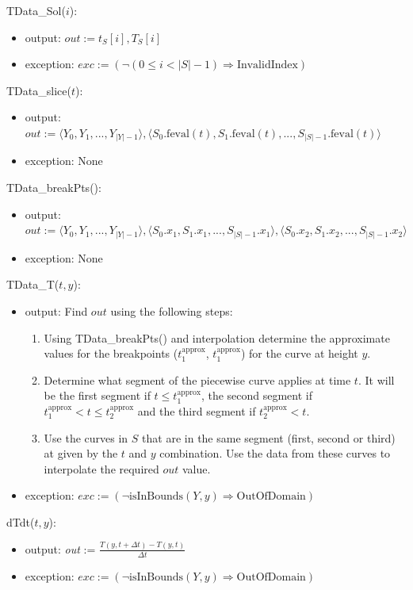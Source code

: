 \documentclass[12pt, titlepage]{article}
\begin{document}
\noindent TData\_Sol($i$):
\begin{itemize}
\item output: $out := t_S[i], T_S[i]$
\item exception: $exc := (\neg(0 \leq i < |S|-1) \Rightarrow \mbox{InvalidIndex})$
\end{itemize}

\noindent TData\_slice($t$):
\begin{itemize}
\item output: $out := \langle Y_0, Y_1, ..., Y_{|Y|-1} \rangle, \langle
  S_0.\mbox{feval}(t), S_1.\mbox{feval}(t), ..., S_{|S|-1}.\mbox{feval}(t)
  \rangle$
\item exception: None
\end{itemize}

\noindent TData\_breakPts():
\begin{itemize}
\item output: $out := \langle Y_0, Y_1, ..., Y_{|Y|-1} \rangle, \langle
  S_0.x_1, S_1.x_1, ..., S_{|S|-1}.x_1 \rangle, \langle S_0.x_2, S_1.x_2, ..., S_{|S|-1}.x_2
  \rangle$
\item exception: None
\end{itemize}

\noindent TData\_T($t, y$):
\begin{itemize}
\item output: Find $out$ using the following steps:
\begin{enumerate}
\item Using TData\_breakPts() and interpolation determine the approximate values
  for the breakpoints ($t_1^\text{approx}$, $t_1^\text{approx}$) for the curve
  at height $y$.
\item Determine what segment of the piecewise curve applies at time $t$.  It
  will be the first segment if $t \leq t_1^\text{approx}$, the second segment if
  $t_1^\text{approx} < t \leq t_2^\text{approx}$ and the third segment if
  $t_2^\text{approx} < t$.
\item Use the curves in $S$ that are in the same segment (first, second or
  third) at given by the $t$ and $y$ combination.  Use the data from these
  curves to interpolate the required $out$ value.
\end{enumerate}
\item exception: $exc := (\neg \mbox{isInBounds}(Y, y) \Rightarrow \mbox{OutOfDomain})$
\end{itemize}

\noindent dTdt($t, y$):
\begin{itemize}
\item output: \textit{out} := $\frac{T(y, t + \Delta t) - T(y, t)}{\Delta t}$
\item exception: $exc := (\neg \mbox{isInBounds}(Y, y) \Rightarrow \mbox{OutOfDomain})$
\end{itemize}
\end{document}
